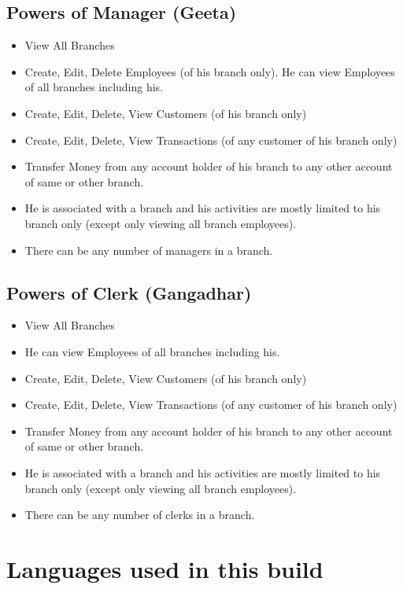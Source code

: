 \documentclass{article}
\begin{document}
 
 \subsection{Powers of Manager (Geeta)}
 \begin{itemize}
 \item View All Branches
 \item Create, Edit, Delete Employees (of his branch only). He can view Employees of all branches including his.
 \item Create, Edit, Delete, View Customers (of his branch only)
 \item Create, Edit, Delete, View Transactions (of any customer of his branch only)
 \item Transfer Money from any account holder of his branch to any other account of same or other branch.
 \item He is associated with a branch and his activities are mostly limited to his branch only (except only viewing all branch employees).
 \item There can be any number of managers in a branch.
 \end{itemize}
 
 \subsection{Powers of Clerk (Gangadhar)}
 \begin{itemize}
 \item View All Branches
 \item He can view Employees of all branches including his.
 \item Create, Edit, Delete, View Customers (of his branch only)
 \item Create, Edit, Delete, View Transactions (of any customer of his branch only)
 \item Transfer Money from any account holder of his branch to any other account of same or other branch.
 \item He is associated with a branch and his activities are mostly limited to his branch only (except only viewing all branch employees).
 \item There can be any number of clerks in a branch.
 \end{itemize}
 \pagebreak

\section{Languages used in this build}
\end{document}
